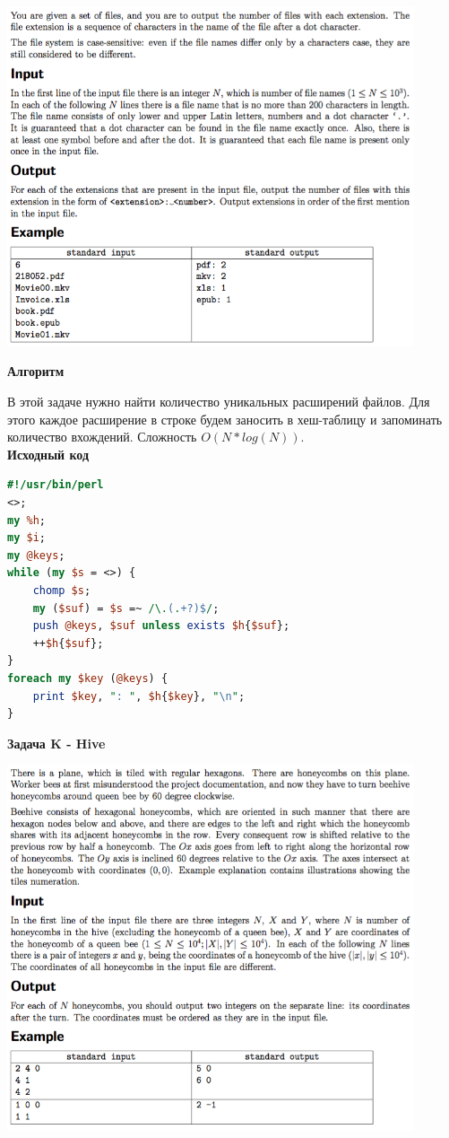 \documentclass[a4paper,12pt]{article}
\begin{document}
\begin{center}
\includegraphics[width=0.9\textwidth]{OC_Siberia/G.png}\\ [1cm]
\end{center}

\textbf{{\large Алгоритм}}

В этой задаче нужно найти количество уникальных расширений файлов. Для этого каждое расширение в строке будем заносить в хеш-таблицу и запоминать количество вхождений. Сложность $O(N * log(N))$. \\

\textbf{{\large Исходный код}} \\
\begin{lstlisting}[language=Perl]
#!/usr/bin/perl
<>;
my %h;
my $i;
my @keys;
while (my $s = <>) {
	chomp $s;
	my ($suf) = $s =~ /\.(.+?)$/;
	push @keys, $suf unless exists $h{$suf};
	++$h{$suf};
}
foreach my $key (@keys) {
	print $key, ": ", $h{$key}, "\n";
}
\end{lstlisting}


\newpage
\textbf{{\large Задача K - Hive}}

\begin{center}
\includegraphics[width=0.9\textwidth]{OC_Siberia/K.png}\\ [1cm]
\end{center}
\end{document}
